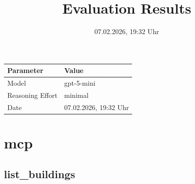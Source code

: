 \documentclass[a4paper,11pt]{article}
\title{Evaluation Results}
\date{07.02.2026, 19:32 Uhr}
\begin{document}
\maketitle

\begin{table}[H]
\centering
\begin{tabular}{l l}
\toprule
\textbf{Parameter} & \textbf{Value} \\
\midrule
Model & gpt-5-mini \\
Reasoning Effort & minimal \\
Date & 07.02.2026, 19:32 Uhr \\
\bottomrule
\end{tabular}
\end{table}

\tableofcontents
\clearpage

\section{mcp}

\subsection{list\_buildings}
\end{document}
